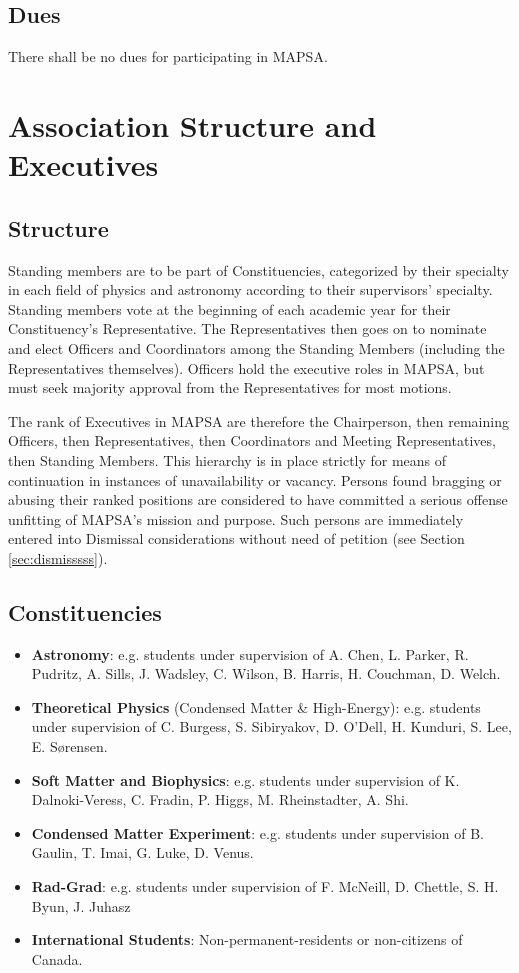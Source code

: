 \documentclass[8pt]{article}
\begin{document}
	\subsection{Dues}
	There shall be no dues for participating in MAPSA.
	
	\section{Association Structure and Executives}
	\subsection{Structure}\label{subsec:structure}
	Standing members are to be part of Constituencies, categorized by their specialty in each field of physics and astronomy according to their supervisors' specialty. Standing members vote at the beginning of each academic year for their Constituency's Representative. The Representatives then goes on to nominate and elect Officers and Coordinators among the Standing Members (including the Representatives themselves). Officers hold the executive roles in MAPSA, but must seek majority approval from the Representatives for most motions. 
	
	\noindent The rank of Executives in MAPSA are therefore the Chairperson, then remaining Officers, then Representatives, then Coordinators and Meeting Representatives, then Standing Members. This hierarchy is in place strictly for means of continuation in instances of unavailability or vacancy. Persons found bragging or abusing their ranked positions are considered to have committed a serious offense unfitting of MAPSA's mission and purpose. Such persons are immediately entered into Dismissal considerations without need of petition (see Section \ref{sec:dismisssss}).
	\subsection{Constituencies}
	\begin{itemize}
		\item \textbf{Astronomy}: e.g. students under supervision of A. Chen, L. Parker, R. Pudritz, A. Sills, J. Wadsley, C. Wilson, B. Harris, H. Couchman, D. Welch.
		\item \textbf{Theoretical Physics} (Condensed Matter \& High-Energy): e.g. students under supervision of C. Burgess, S. Sibiryakov, D. O'Dell, H. Kunduri, S. Lee, E. Sørensen.
		\item \textbf{Soft Matter and Biophysics}: e.g. students under supervision of K. Dalnoki-Veress, C. Fradin, P. Higgs, M. Rheinstadter, A. Shi.
		\item \textbf{Condensed Matter Experiment}: e.g. students under supervision of B. Gaulin, T. Imai, G. Luke, D. Venus.
		\item \textbf{Rad-Grad}: e.g. students under supervision of F. McNeill, D. Chettle, S. H. Byun, J. Juhasz
		\item \textbf{International Students}: Non-permanent-residents or non-citizens of Canada.
	\end{itemize}
	
\end{document}
